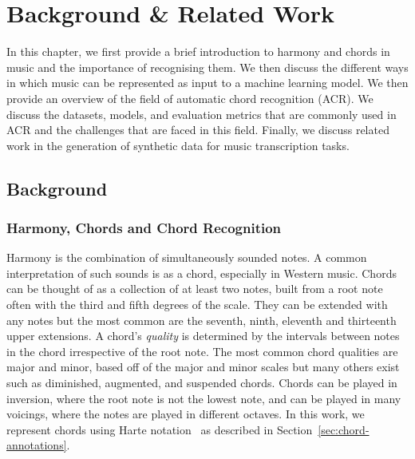 \chapter{Background \& Related Work}

In this chapter, we first provide a brief introduction to harmony and chords in music and the importance of recognising them. We then discuss the different ways in which music can be represented as input to a machine learning model. We then provide an overview of the field of automatic chord recognition (ACR). We discuss the datasets, models, and evaluation metrics that are commonly used in ACR and the challenges that are faced in this field. Finally, we discuss related work in the generation of synthetic data for music transcription tasks.

\section{Background}

\subsection{Harmony, Chords and Chord Recognition}

Harmony is the combination of simultaneously sounded notes. A common interpretation of such sounds is as a chord, especially in Western music. Chords can be thought of as a collection of at least two notes, built from a root note often with the third and fifth degrees of the scale. They can be extended with any notes but the most common are the seventh, ninth, eleventh and thirteenth upper extensions. A chord's \emph{quality} is determined by the intervals between notes in the chord irrespective of the root note. The most common chord qualities are major and minor, based off of the major and minor scales but many others exist such as diminished, augmented, and suspended chords. Chords can be played in inversion, where the root note is not the lowest note, and can be played in many voicings, where the notes are played in different octaves. In this work, we represent chords using Harte notation~\citep{HarteNotation} as described in Section~\ref{sec:chord-annotations}.

